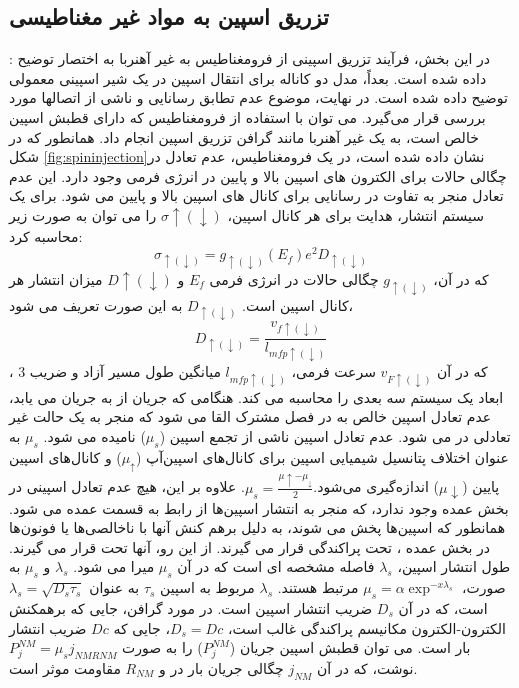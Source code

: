 \subsection{تزریق اسپین به مواد غیر مغناطیسی}:
در این بخش، فرآیند تزریق اسپینی از فرومغناطیس به غیر آهنربا به اختصار توضیح داده شده است. بعداً، مدل دو کاناله برای انتقال اسپین در یک شیر اسپینی معمولی توضیح داده شده است. در نهایت، موضوع عدم تطابق رسانایی و  ناشی از اتصالها مورد بررسی قرار می‌گیرد.
می توان با استفاده از فرومغناطیس  که دارای قطبش اسپین خالص است، به یک غیر آهنربا  مانند گرافن تزریق اسپین انجام داد. همانطور که در شکل \ref{fig:spininjection}نشان داده شده است، در یک فرومغناطیس، عدم تعادل در چگالی حالات برای الکترون های اسپین بالا و پایین در انرژی فرمی وجود دارد. این عدم تعادل منجر به تفاوت در رسانایی برای کانال های اسپین بالا و پایین می شود. برای یک سیستم انتشار، هدایت برای هر کانال اسپین، $\sigma\uparrow(\downarrow)$ را می توان به صورت زیر محاسبه کرد:
\begin{equation}
    \sigma_{\uparrow(\downarrow)} = g _{\uparrow(\downarrow)}(E_f) e^2 D_{\uparrow(\downarrow)}
    \label{eq:spintransport}
\end{equation}
که در آن، $g_{\uparrow(\downarrow)}$ چگالی حالات در انرژی فرمی $E_f$ و $D\uparrow(\downarrow)$ میزان انتشار هر کانال اسپین است. $D_{\uparrow(\downarrow)}$ به این صورت تعریف می شود،
\begin{equation}
    D_{\uparrow(\downarrow)}=\frac{v_{f\uparrow(\downarrow)}}{l_{mfp\uparrow(\downarrow)}}
\end{equation}
، که در آن $v_{F\uparrow(\downarrow)}$ سرعت فرمی، $l_{mfp\uparrow(\downarrow)}$ میانگین طول مسیر آزاد و ضریب 3 ابعاد یک سیستم سه بعدی را محاسبه می کند.
هنگامی که جریان از  به  جریان می یابد، عدم تعادل اسپین خالص  به  در فصل مشترک القا می شود که منجر به یک حالت غیر تعادلی در  می شود. عدم تعادل اسپین ناشی از تجمع اسپین ($\mu_s$) نامیده می شود. $\mu_s$ به عنوان اختلاف پتانسیل شیمیایی اسپین برای کانال‌های اسپین‌آپ ($\mu_{\uparrow}$) و کانال‌های اسپین پایین ($\mu\downarrow$) اندازه‌گیری می‌شود.$\mu_s=\frac{\mu{\uparrow}-\mu_{\downarrow}}{2}$.
علاوه بر این، هیچ عدم تعادل اسپینی در بخش عمده  وجود ندارد، که منجر به انتشار اسپین‌ها از رابط به قسمت عمده  می شود. همانطور که اسپین‌ها پخش می شوند، به دلیل برهم کنش آنها با ناخالصی‌ها یا فونون‌ها در بخش عمده ، تحت پراکندگی قرار می گیرند. از این رو، آنها   تحت  قرار می گیرند. طول انتشار اسپین، $\lambda_s$ فاصله مشخصه ای است که در آن $\mu_s$ میرا می شود. $\lambda_s$ و $\mu_s$ به صورت، $\mu_s = \alpha\exp^{-x\lambda_s}$ مرتبط هستند. $\lambda_s$ مربوط به  اسپین $\tau_s$ به عنوان $\lambda_s=\sqrt{D_s\tau_s}$ است، که در آن $D_s$ ضریب انتشار اسپین است. در مورد گرافن، جایی که برهمکنش الکترون-الکترون مکانیسم پراکندگی غالب است، $D_s=Dc$، جایی که $Dc$ ضریب انتشار بار است. می توان قطبش اسپین جریان ($P_{j}^{NM}$)  را به صورت $P_{j}^{NM} = \mu_sj_{NMRNM}$ نوشت، که در آن $j_{NM}$ چگالی جریان بار در  و $R_{NM}$ مقاومت موثر  است.
